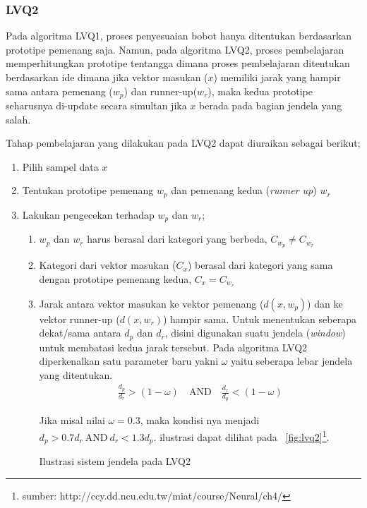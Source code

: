 \subsubsection*{LVQ2}
Pada algoritma LVQ1, proses penyesuaian bobot hanya ditentukan berdasarkan
prototipe pemenang saja. Namun, pada algoritma LVQ2, proses pembelajaran
memperhitungkan prototipe tentangga dimana proses pembelajaran ditentukan
berdasarkan ide dimana jika vektor masukan ($x$) memiliki jarak yang hampir sama
antara pemenang ($w_p$) dan runner-up($w_r$), maka kedua prototipe seharusnya
di-update secara simultan jika $x$ berada pada bagian jendela yang salah.

\noindent
Tahap pembelajaran yang dilakukan pada LVQ2 dapat diuraikan sebagai berikut;
\begin{enumerate}
  \setlength{\itemsep}{1pt}
  \setlength{\parskip}{0pt}
  \setlength{\parsep}{0pt}
  \item Pilih sampel data $x$
  \item Tentukan prototipe pemenang $w_p$ dan pemenang kedua (\textit{runner
  up}) $w_r$
  \item Lakukan pengecekan terhadap $w_p$ dan $w_r$;
  \begin{enumerate}
    \item $w_p$ dan $w_r$ harus berasal dari kategori yang berbeda, $C_{w_p}
    \neq C_{w_r}$
    \item Kategori dari vektor masukan ($C_x$) berasal dari kategori yang sama
    dengan prototipe pemenang kedua, $C_x = C_{w_r}$
    \item Jarak antara vektor masukan ke vektor pemenang ($d(x, w_p)$) dan
    ke vektor runner-up ($d(x, w_r)$) hampir sama. 
    Untuk menentukan seberapa dekat/sama antara $d_p$ dan $d_r$, disini
    digunakan suatu jendela (\textit{window}) untuk membatasi kedua jarak
    tersebut. Pada algoritma LVQ2 diperkenalkan satu parameter baru yakni
    $\omega$ yaitu seberapa lebar jendela yang ditentukan.
    \begin{align}
    \frac{d_p}{d_r} > (1 - \omega)\quad \text{AND}\quad \frac{d_r}{d_p} < (1 -
    \omega)
    \nonumber
    \end{align}
    
    Jika misal nilai $\omega=0.3$, maka kondisi nya menjadi $d_p > 0.7 d_r
   \ \text{AND}\ d_r < 1.3 d_p$. ilustrasi dapat dilihat pada
    \pic~\ref{fig:lvq2}\footnote{sumber:
    {http://ccy.dd.ncu.edu.tw/miat/course/Neural/ch4/}}.
    
    {Ilustrasi sistem jendela pada LVQ2} 
  \end{enumerate}
    

\end{enumerate}
